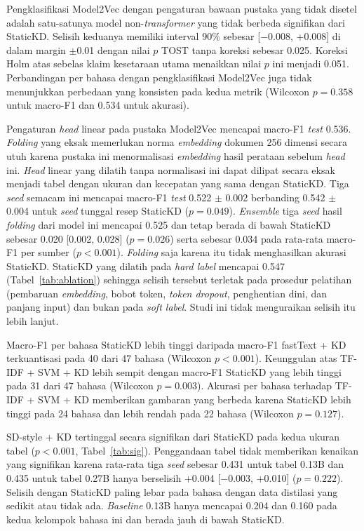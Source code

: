 \documentclass{ieeeaccess}
\newcommand{\en}[1]{\textit{#1}}
\begin{document}
Pengklasifikasi Model2Vec dengan pengaturan bawaan pustaka yang tidak disetel adalah satu-satunya model non-\en{transformer} yang tidak berbeda signifikan dari StaticKD. Selisih keduanya memiliki interval 90\% sebesar [$-$0.008, +0.008] di dalam margin $\pm$0.01 dengan nilai $p$ TOST tanpa koreksi sebesar 0.025. Koreksi Holm atas sebelas klaim kesetaraan utama menaikkan nilai $p$ ini menjadi 0.051. Perbandingan per bahasa dengan pengklasifikasi Model2Vec juga tidak menunjukkan perbedaan yang konsisten pada kedua metrik (Wilcoxon $p=0.358$ untuk macro-F1 dan 0.534 untuk akurasi).

Pengaturan \en{head} linear pada pustaka Model2Vec mencapai macro-F1 \en{test} 0.536. \en{Folding} yang eksak memerlukan norma \en{embedding} dokumen 256 dimensi secara utuh karena pustaka ini menormalisasi \en{embedding} hasil perataan sebelum \en{head} ini. \en{Head} linear yang dilatih tanpa normalisasi ini dapat dilipat secara eksak menjadi tabel dengan ukuran dan kecepatan yang sama dengan StaticKD. Tiga \en{seed} semacam ini mencapai macro-F1 \en{test} 0.522 $\pm$ 0.002 berbanding 0.542 $\pm$ 0.004 untuk \en{seed} tunggal resep StaticKD ($p=0.049$). \en{Ensemble} tiga \en{seed} hasil \en{folding} dari model ini mencapai 0.525 dan tetap berada di bawah StaticKD sebesar 0.020 [0.002, 0.028] ($p=0.026$) serta sebesar 0.034 pada rata-rata macro-F1 per sumber ($p<0.001$). \en{Folding} saja karena itu tidak menghasilkan akurasi StaticKD. StaticKD yang dilatih pada \en{hard label} mencapai 0.547 (Tabel~\ref{tab:ablation}) sehingga selisih tersebut terletak pada prosedur pelatihan (pembaruan \en{embedding}, bobot token, \en{token dropout}, penghentian dini, dan panjang input) dan bukan pada \en{soft label}. Studi ini tidak menguraikan selisih itu lebih lanjut.

Macro-F1 per bahasa StaticKD lebih tinggi daripada macro-F1 fastText + KD terkuantisasi pada 40 dari 47 bahasa (Wilcoxon $p<0.001$). Keunggulan atas TF-IDF + SVM + KD lebih sempit dengan macro-F1 StaticKD yang lebih tinggi pada 31 dari 47 bahasa (Wilcoxon $p=0.003$). Akurasi per bahasa terhadap TF-IDF + SVM + KD memberikan gambaran yang berbeda karena StaticKD lebih tinggi pada 24 bahasa dan lebih rendah pada 22 bahasa (Wilcoxon $p=0.127$).

SD-style + KD tertinggal secara signifikan dari StaticKD pada kedua ukuran tabel ($p<0.001$, Tabel~\ref{tab:sig}). Penggandaan tabel tidak memberikan kenaikan yang signifikan karena rata-rata tiga \en{seed} sebesar 0.431 untuk tabel 0.13B dan 0.435 untuk tabel 0.27B hanya berselisih +0.004 [$-$0.003, +0.010] ($p=0.222$). Selisih dengan StaticKD paling lebar pada bahasa dengan data distilasi yang sedikit atau tidak ada. \en{Baseline} 0.13B hanya mencapai 0.204 dan 0.160 pada kedua kelompok bahasa ini dan berada jauh di bawah StaticKD.
\end{document}
